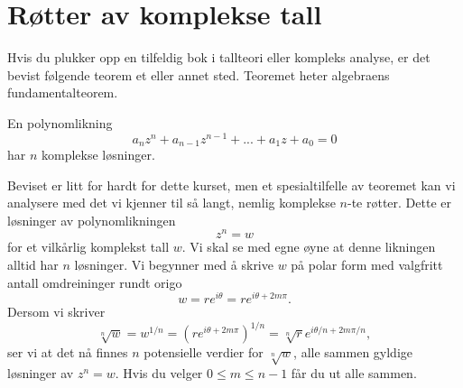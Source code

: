 \section*{Røtter av komplekse tall}
Hvis du plukker opp en tilfeldig bok i tallteori eller kompleks analyse, er det bevist følgende teorem et eller annet sted. Teoremet heter algebraens fundamentalteorem.
\begin{thm}
En polynomlikning
\[
a_nz^n+a_{n-1}z^{n-1}+...+a_1z+a_0=0
\]
har $n$ komplekse løsninger.
\end{thm}
\noindent Beviset er litt for hardt for dette kurset, men et spesialtilfelle av teoremet kan vi analysere med det vi kjenner til så langt, nemlig komplekse $n$-te røtter.  Dette er løsninger av polynomlikningen
\[
z^n=w
\]
for et vilkårlig komplekst tall $w$. Vi skal se med egne øyne at denne likningen alltid har $n$ løsninger. Vi begynner med å skrive $w$ på polar form med valgfritt antall omdreininger rundt origo
\[
w = re^{i \theta}=re^{i \theta+2m\pi}.
\]
Dersom vi skriver 
\[
\sqrt[n]{w}=w^{1/n} = (re^{i \theta+2m\pi})^{1/n}=\sqrt[n]{r}e^{i \theta/n+2m\pi/n},
\]
ser vi at det nå finnes $n$ potensielle verdier for $\sqrt[n]{w}$, alle sammen gyldige løsninger av $z^n=w$. Hvis du velger $0\leq m \leq n-1$ får du ut alle sammen. 
